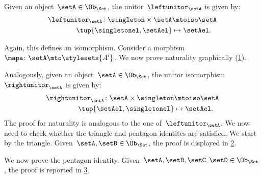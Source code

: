 \begin{example}
  Given an object~$\setA\in \Ob_\Set$, the unitor~$\leftunitor_\setA$ is given by:
  \begin{equation*}
      \label{eq:set_mon_prod_4}
    \begin{aligned}
      \leftunitor_\setA\colon \singleton \times \setA &\mtoiso \setA\\
      \tup{\singletonel,\setAel}&\mapsto \setAel.
    \end{aligned}
  \end{equation*}

  Again, this defines an isomorphism.
  Consider a morphism~$\mapa\colon \setA\mto \stylesets{A'}$.
  We now prove naturality graphically (\cref{fig:monoidal_set_unit_nat}).

  \begin{figure}[h!]
    \begin{center}
    \end{center}
    \caption{\label{fig:monoidal_set_unit_nat}}
  \end{figure}

  Analogously, given an object~$\setA\in \Ob_{\Set}$, the unitor isomorphism~$\rightunitor_\setA$ is given by:
  \begin{equation*}
      \label{eq:set_mon_prod_5}
    \begin{aligned}
      \rightunitor_\setA\colon \setA\times \singleton &\mtoiso \setA\\
      \tup{\setAel,\singletonel}&\mapsto \setAel.
    \end{aligned}
  \end{equation*}
  The proof for naturality is analogous to the one of~$\leftunitor_\setA$.
  We now need to check whether the triangle and pentagon identites are satisfied.
  We start by the triangle. Given~$\setA,\setB\in \Ob_{\Set}$, the proof is displayed in \cref{fig:set_mon_triangle}.

  \begin{figure}[h]
    \begin{center}
    \end{center}
    \caption{\label{fig:set_mon_triangle}}
  \end{figure}

  We now prove the pentagon identity. Given~$\setA,\setB,\setC,\setD\in \Ob_\Set$, the proof is reported in \cref{fig:set_mon_pent}.

  \begin{figure}[h]
    \begin{center}
    \end{center}
    \caption{\label{fig:set_mon_pent}}
  \end{figure}
\end{example}


